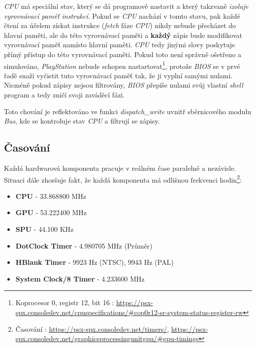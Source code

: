 \textit{CPU} má speciální stav, který se dá programově nastavit a který takzvaně \textit{izoluje vyrovnávací paměť instrukcí}. 
Pokud se  \textit{CPU} nachází v tomto stavu, pak každé čtení za účelem získat instrukce (\textit{fetch} fáze  \textit{CPU}) nikdy nebude přecházet do hlavní paměti, ale do této vyrovnávací paměti a \textbf{každý} zápis bude modifikovat vyrovnávací paměť namísto hlavní paměti.
\textit{CPU} tedy jinými slovy poskytuje přímý přístup do této vyrovnávací paměti.
Pokud toto není správně ošetřeno a simulováno, \textit{PlayStation} nebude schopen nastartovat\footnote{Koprocesor 0, registr 12, bit 16 \cite{PSXSpec}: \url{https://psx-spx.consoledev.net/cpuspecifications/\#cop0r12-sr-system-status-register-rw}}, 
protože \textit{BIOS} se v prvé řadě snaží vyčistit tuto vyrovnávací paměť tak, že ji vyplní samými nulami. Nicméně
pokud zápisy nejsou filtrovány, \textit{BIOS} přepíše nulami svůj vlastní \textit{shell} program a tedy zničí svoji zaváděcí fázi.

Toto chování je reflektováno ve funkci \textit{dispatch\_write} uvnitř sběrnicového modulu \textit{Bus}, kde se kontroluje stav \textit{CPU} a filtrují se zápisy.

\subsection{Časování}

Každá hardwarová komponenta pracuje v reálném čase paralelně a nezávisle. Situaci dále zhoršuje fakt, že každá komponenta má odlišnou frekvenci hodin\footnote{Časování \cite{PSXSpec}: \url{https://psx-spx.consoledev.net/timers/}, \url{https://psx-spx.consoledev.net/graphicsprocessingunitgpu/\#gpu-timings}}:

\begin{itemize}
    \label{Rychlost hodin komponent}
    \item{\textbf{CPU} - 33.868800 MHz}
    \item{\textbf{GPU} - 53.222400 MHz}
    \item{\textbf{SPU} - 44.100 KHz}
    \item{\textbf{DotClock Timer} - 4.980705 MHz (Průměr)}
    \item{\textbf{HBlank Timer} - 9923 Hz (NTSC), 9943 Hz (PAL)}
    \item{\textbf{System Clock/8 Timer} - 4.233600 MHz}
\end{itemize}

